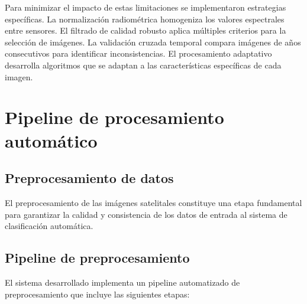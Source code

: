 Para minimizar el impacto de estas limitaciones se implementaron estrategias específicas. La normalización radiométrica homogeniza los valores espectrales entre sensores. El filtrado de calidad robusto aplica múltiples criterios para la selección de imágenes. La validación cruzada temporal compara imágenes de años consecutivos para identificar inconsistencias. El procesamiento adaptativo desarrolla algoritmos que se adaptan a las características específicas de cada imagen.

\section{Pipeline de procesamiento automático}


\subsection{Preprocesamiento de datos}

El preprocesamiento de las imágenes satelitales constituye una etapa fundamental para garantizar la calidad y consistencia de los datos de entrada al sistema de clasificación automática.

\subsection{Pipeline de preprocesamiento}

El sistema desarrollado implementa un pipeline automatizado de preprocesamiento que incluye las siguientes etapas:

